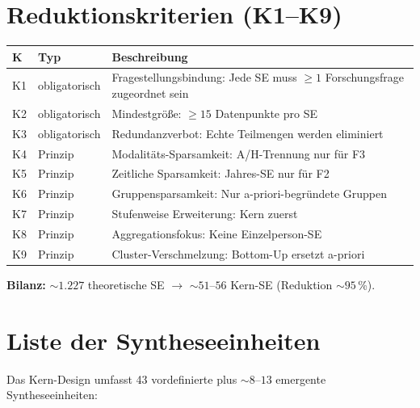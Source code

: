 \documentclass[12pt,a4paper]{article}
\begin{document}
\section{Reduktionskriterien (K1--K9)}
\label{app:reduktion}

\begin{longtable}{l l p{8cm}}
  \toprule
  \textbf{K} & \textbf{Typ} & \textbf{Beschreibung} \\
  \midrule
  \endfirsthead
  K1 & obligatorisch & Fragestellungsbindung: Jede SE muss $\geq 1$ Forschungsfrage zugeordnet sein \\
  K2 & obligatorisch & Mindestgr\"o\ss{}e: $\geq 15$ Datenpunkte pro SE \\
  K3 & obligatorisch & Redundanzverbot: Echte Teilmengen werden eliminiert \\
  K4 & Prinzip & Modalit\"ats-Sparsamkeit: A/H-Trennung nur f\"ur F3 \\
  K5 & Prinzip & Zeitliche Sparsamkeit: Jahres-SE nur f\"ur F2 \\
  K6 & Prinzip & Gruppensparsamkeit: Nur a-priori-begr\"undete Gruppen \\
  K7 & Prinzip & Stufenweise Erweiterung: Kern zuerst \\
  K8 & Prinzip & Aggregationsfokus: Keine Einzelperson-SE \\
  K9 & Prinzip & Cluster-Verschmelzung: Bottom-Up ersetzt a-priori \\
  \bottomrule
\end{longtable}

\textbf{Bilanz:} ${\sim}1.227$ theoretische SE $\to$ ${\sim}51$--$56$ Kern-SE (Reduktion ${\sim}95$\,\%).


\section{Liste der Syntheseeinheiten}
\label{app:se}

Das Kern-Design umfasst 43 vordefinierte plus ${\sim}8$--$13$ emergente Syntheseeinheiten:
\end{document}
